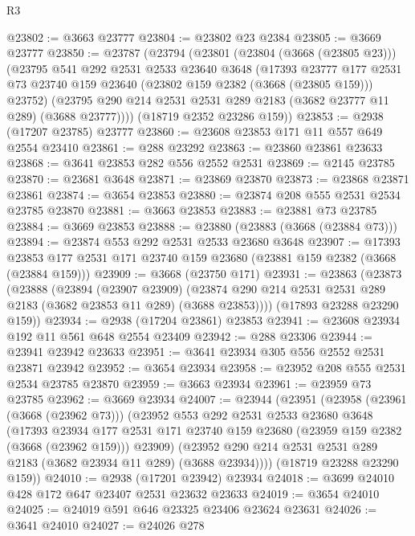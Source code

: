\begin{lexlean}{R3}
\begin{coremodule}
@23802 := @3663 @23777
@23804 := @23802 @23 @2384
@23805 := @3669 @23777
@23850 := @23787
    (@23794
      (@23801
        (@23804 (@3668 (@23805 @23)))
        (@23795
          @541
          @292
          @2531
          @2533
          @23640
          @3648
          (@17393
            @23777
            @177
            @2531
            @73
            @23740
            @159
            @23640
            (@23802 @159 @2382 (@3668 (@23805 @159)))
            @23752)
          (@23795 @290 @214 @2531 @2531 @289 @2183 (@3682 @23777 @11 @289) (@3688 @23777))))
      (@18719 @2352 @23286 @159))
@23853 := @2938 (@17207 @23785) @23777
@23860 := @23608 @23853 @171 @11 @557 @649 @2554 @23410
@23861 := @288 @23292
@23863 := @23860 @23861 @23633
@23868 := @3641 @23853 @282 @556 @2552 @2531
@23869 := @2145 @23785
@23870 := @23681 @3648
@23871 := @23869 @23870
@23873 := @23868 @23871 @23861
@23874 := @3654 @23853
@23880 := @23874 @208 @555 @2531 @2534 @23785 @23870
@23881 := @3663 @23853
@23883 := @23881 @73 @23785
@23884 := @3669 @23853
@23888 := @23880 (@23883 (@3668 (@23884 @73)))
@23894 := @23874 @553 @292 @2531 @2533 @23680 @3648
@23907 := @17393 @23853 @177 @2531 @171 @23740 @159 @23680 (@23881 @159 @2382 (@3668 (@23884 @159)))
@23909 := @3668 (@23750 @171)
@23931 := @23863
    (@23873
      (@23888
        (@23894
          (@23907 @23909)
          (@23874 @290 @214 @2531 @2531 @289 @2183 (@3682 @23853 @11 @289) (@3688 @23853))))
      (@17893 @23288 @23290 @159))
@23934 := @2938 (@17204 @23861) @23853
@23941 := @23608 @23934 @192 @11 @561 @648 @2554 @23409
@23942 := @288 @23306
@23944 := @23941 @23942 @23633
@23951 := @3641 @23934 @305 @556 @2552 @2531 @23871 @23942
@23952 := @3654 @23934
@23958 := @23952 @208 @555 @2531 @2534 @23785 @23870
@23959 := @3663 @23934
@23961 := @23959 @73 @23785
@23962 := @3669 @23934
@24007 := @23944
    (@23951
      (@23958
        (@23961 (@3668 (@23962 @73)))
        (@23952
          @553
          @292
          @2531
          @2533
          @23680
          @3648
          (@17393
            @23934
            @177
            @2531
            @171
            @23740
            @159
            @23680
            (@23959 @159 @2382 (@3668 (@23962 @159)))
            @23909)
          (@23952 @290 @214 @2531 @2531 @289 @2183 (@3682 @23934 @11 @289) (@3688 @23934))))
      (@18719 @23288 @23290 @159))
@24010 := @2938 (@17201 @23942) @23934
@24018 := @3699 @24010 @428 @172 @647 @23407 @2531 @23632 @23633
@24019 := @3654 @24010
@24025 := @24019 @591 @646 @23325 @23406 @23624 @23631
@24026 := @3641 @24010
@24027 := @24026 @278

\end{coremodule}
\end{lexlean}
